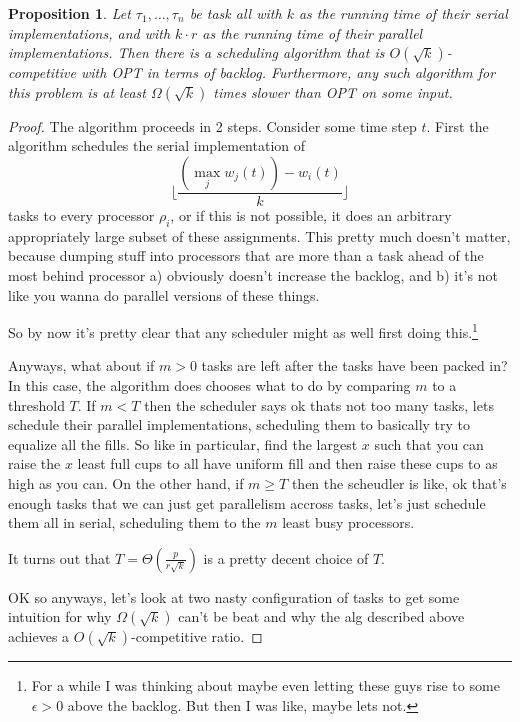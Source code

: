 \documentclass{article}[11pt]
\newtheorem{proposition}{Proposition}
\begin{document}
\begin{proposition}
  Let $\tau_1, \ldots, \tau_n$ be task all with $k$ as the
  running time of their serial implementations, and with
  $k\cdot r$ as the running time of their parallel
  implementations. Then there is a scheduling algorithm that is
  $O(\sqrt{k})$-competitive with OPT in terms of backlog.
  Furthermore, any such algorithm for this problem is at least
  $\Omega(\sqrt{k})$ times slower than OPT on some input.
\end{proposition}
\begin{proof}
  The algorithm proceeds in 2 steps.
  Consider some time step $t$. 
  First the algorithm schedules the serial implementation of
  $$\Big\lfloor\frac{(\max_j w_j(t)) - w_i(t)}{k} \Big\rfloor$$
  tasks to every processor $\rho_i$, or if this is not possible,
  it does an arbitrary appropriately large subset of these
  assignments. This pretty much doesn't matter, because dumping
  stuff into processors that are more than a task ahead of the
  most behind processor a) obviously doesn't increase the
  backlog, and b) it's not like you wanna do parallel versions of
  these things.

  So by now it's pretty clear that any scheduler might as well
  first doing this.\footnote{For a while I was thinking about
  maybe even letting these guys rise to some $\epsilon > 0$ above
the backlog. But then I was like, maybe lets not.}

  Anyways, what about if $m>0$ tasks are left after the tasks
  have been packed in?
  In this case, the algorithm does chooses what to do by
  comparing $m$ to a threshold $T$. If $m < T$ then the scheduler
  says ok thats not too many tasks, lets schedule their parallel
  implementations, scheduling them to basically try to equalize
  all the fills. So like in particular, find the largest $x$ such
  that you can raise the $x$ least full cups to all have uniform
  fill and then raise these cups to as high as you can.
  On the other hand, if $m \ge T$ then the scheudler is like, ok
  that's enough tasks that we can just get parallelism accross
  tasks, let's just schedule them all in serial, scheduling them
  to the $m$ least busy processors.

  It turns out that $T = \Theta\left(\frac{p}{r\sqrt{k}}\right)$
  is a pretty decent choice of $T$.

  OK so anyways, let's look at two nasty configuration of tasks
  to get some intuition for why $\Omega(\sqrt{k})$ can't be beat
  and why the alg described above achieves a
  $O(\sqrt{k})$-competitive ratio. 


\end{proof}
\end{document}

